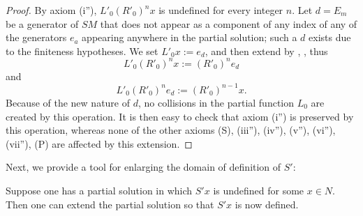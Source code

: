 \begin{proof} \leanok By axiom (i''), $L'_0 (R'_0)^n x$ is undefined for every integer $n$.  Let $d = E_m$ be a generator of $SM$ that does not appear as a component of any index of any of the generators $e_a$ appearing anywhere in the partial solution; such a $d$ exists due to the finiteness hypotheses.  We set $L'_0 x := e_d$, and then extend by , , thus
$$L'_0 (R'_0)^n x := (R'_0)^n e_d$$
and
$$L'_0 (R'_0)^n e_d := (R'_0)^{n-1} x.$$
Because of the new nature of $d$, no collisions in the partial function $L_0$ are created by this operation.  It is then easy to check that axiom (i'') is preserved by this operation, whereas none of the other axioms (S), (iii''), (iv''), (v''), (vi''), (vii''), (P) are affected by this extension.
\end{proof}

Next, we provide a tool for enlarging the domain of definition of $S'$:

\begin{proposition}[Enlarging $S'$]\label{enlarge-S}\leanok  Suppose one has a partial solution in which $S'x$ is undefined for some $x \in N$.  Then one can extend the partial solution so that $S'x$ is now defined.
\end{proposition}

